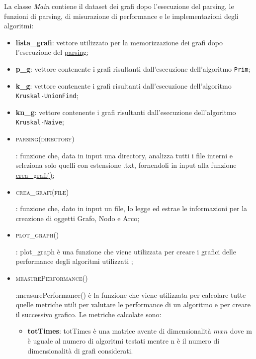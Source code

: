 La classe \textit{Main} contiene il dataset dei grafi dopo l'esecuzione del parsing, le funzioni di parsing, di misurazione di performance e le implementazioni degli algoritmi:

\begin{itemize}
    
    \item \textbf{lista\_grafi}: vettore utilizzato per la memorizzazione dei grafi dopo l'esecuzione del \hyperlink{parsing}{parsing};
    
    \item \textbf{p\_g}: vettore contenente i grafi risultanti dall'esecuzione dell'algoritmo \texttt{Prim};
    
    \item \textbf{k\_g}: vettore contenente i grafi risultanti dall'esecuzione dell'algoritmo \texttt{Kruskal-UnionFind};
    
    \item \textbf{kn\_g}: vettore contenente i grafi risultanti dall'esecuzione dell'algoritmo \texttt{Kruskal-Naive};
    
    
    \item \hypertarget{parsing}{\textsc{parsing(directory)}}: funzione che, data in input una directory, analizza tutti i file interni e seleziona solo quelli con estensione .txt, fornendoli in input alla funzione \hyperlink{creagrafi}{crea\_grafi()};
    
    \item \hypertarget{creagrafi}{\textsc{crea\_grafi(file)}}: funzione che, dato in input un file, lo legge ed estrae le informazioni per la creazione di oggetti Grafo, Nodo e Arco;
    
    \item \hypertarget{plotgrafi}{\textsc{plot\_graph()}}: plot\_graph è una funzione che viene utilizzata per creare i grafici delle performance degli algoritmi utilizzati ;
    
    \item \hypertarget{measureperformance}{\textsc{measurePerformance()}}:measurePerformance() è la funzione che viene utilizzata per calcolare tutte quelle metriche utili per valutare le performance di un algoritmo e per creare il successivo grafico. Le metriche calcolate sono:
   
    \begin{itemize}
        
        \item  \textbf{totTimes}:  totTimes è una matrice avente di dimensionalità $mxn$ dove m è uguale al numero di algoritmi testati mentre n è il numero di dimensionalità di grafi considerati.
        

\end{itemize}
\end{itemize}
